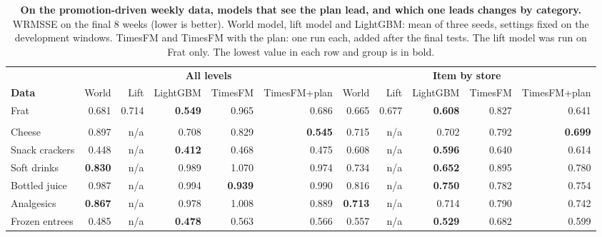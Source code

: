 \begin{table}[t]
\centering
\caption{\textbf{On the promotion-driven weekly data, models that see the plan lead, and which one leads
changes by category.} WRMSSE on the final 8 weeks (lower is better). World model, lift model and LightGBM:
mean of three seeds, settings fixed on the development windows. TimesFM and TimesFM with the plan: one run each,
added after the final tests. The lift model was run on Frat only. The lowest value in each row and group is in bold.}
\label{tab:finals}
\footnotesize
\setlength{\tabcolsep}{4pt}
\begin{tabular}{l*{10}{r}}
\toprule
 & \multicolumn{5}{c}{\textbf{All levels}} & \multicolumn{5}{c}{\textbf{Item by store}} \\
\cmidrule(lr){2-6}\cmidrule(lr){7-11}
\textbf{Data} & World & Lift & LightGBM & TimesFM & TimesFM+plan & World & Lift & LightGBM & TimesFM & TimesFM+plan \\
\midrule
Frat & 0.681 & 0.714 & \textbf{0.549} & 0.965 & 0.686 & 0.665 & 0.677 & \textbf{0.608} & 0.827 & 0.641 \\
\addlinespace[2pt]
\multicolumn{11}{l}{\itshape Dominick's} \\
Cheese & 0.897 & n/a & 0.708 & 0.829 & \textbf{0.545} & 0.715 & n/a & 0.702 & 0.792 & \textbf{0.699} \\
Snack crackers & 0.448 & n/a & \textbf{0.412} & 0.468 & 0.475 & 0.608 & n/a & \textbf{0.596} & 0.640 & 0.614 \\
Soft drinks & \textbf{0.830} & n/a & 0.989 & 1.070 & 0.974 & 0.734 & n/a & \textbf{0.652} & 0.895 & 0.780 \\
Bottled juice & 0.987 & n/a & 0.994 & \textbf{0.939} & 0.990 & 0.816 & n/a & \textbf{0.750} & 0.782 & 0.754 \\
Analgesics & \textbf{0.867} & n/a & 0.978 & 1.008 & 0.889 & \textbf{0.713} & n/a & 0.714 & 0.790 & 0.742 \\
Frozen entrees & 0.485 & n/a & \textbf{0.478} & 0.563 & 0.566 & 0.557 & n/a & \textbf{0.529} & 0.682 & 0.599 \\
\bottomrule
\end{tabular}
\end{table}

